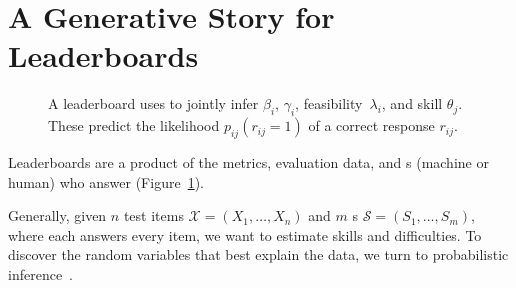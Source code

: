 \section{A Generative Story for Leaderboards}
\label{ch:isicle:lead}

\begin{figure}[t]
  \centering
  \caption{
    A \name{} leaderboard uses \irt{} to jointly infer \itm{} \diff{} $\beta_i$, \discability{} $\gamma_i$, feasibility~$\lambda_i$, and \subj{} skill $\theta_j$.
    These predict the likelihood $p_{ij}(r_{ij}=1)$ of a correct response $r_{ij}$.
  }
  \label{fig:story}
\end{figure}

Leaderboards are a product of the metrics, evaluation data, and
\subj{}s (machine or human) who answer \itms{}
(Figure~\ref{fig:story}).


Generally, given $n$ test items $\mathcal{X}=(X_1,\ldots,X_n)$
and $m$ \subj{}s
$\mathcal{S}=(S_1,\ldots,S_m)$, where each \subj{} answers every
item, we want to estimate \subj{} skills and \itm{} difficulties.
To discover the random variables that best explain the data, we
turn to probabilistic inference~\cite{pearl-88}.


